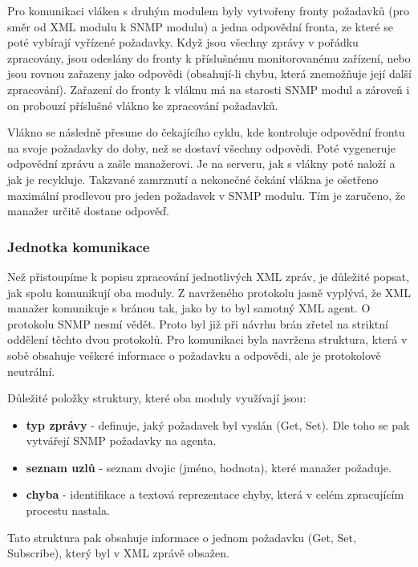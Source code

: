 Pro komunikaci vláken s druhým modulem byly vytvořeny fronty požadavků (pro směr od XML modulu k SNMP modulu)
a jedna odpovědní fronta, ze které se poté vybírají vyřízené požadavky.
Když jsou všechny zprávy v pořádku zpracovány, jsou odeslány do fronty k příslušnému monitorovanému zařízení, nebo jsou rovnou zařazeny
jako odpovědi (obsahují-li chybu, která znemožňuje její další zpracování). Zařazení do fronty k vláknu má na starosti SNMP modul a zároveň
i on probouzí příslušné vlákno ke zpracování požadavků.

Vlákno se následně přesune do čekajícího cyklu, kde kontroluje odpovědní frontu na svoje požadavky do doby, než se dostaví všechny odpovědi. 
Poté vygeneruje odpovědní zprávu a zašle manažerovi. Je na serveru, jak s vlákny poté naloží a jak 
je recykluje. Takzvané zamrznutí a nekonečné čekání vlákna je ošetřeno maximální prodlevou pro jeden požadavek v SNMP modulu. Tím je zaručeno, že
manažer určitě dostane odpověď.

\subsubsection*{Jednotka komunikace}
Než přistoupíme k popisu zpracování jednotlivých XML zpráv, je důležité popsat, jak spolu komunikují oba moduly. Z navrženého protokolu jasně 
vyplývá, že XML manažer komunikuje s bránou tak, jako by to byl samotný XML agent. O protokolu SNMP nesmí vědět. Proto byl již při návrhu
brán zřetel na striktní oddělení těchto dvou protokolů. Pro komunikaci byla navržena struktura, která v sobě obsahuje veškeré informace o
požadavku a odpovědi, ale je protokolově neutrální.

Důležité položky struktury, které oba moduly využívají jsou:
\begin{itemize}
	\item \textbf{typ zprávy} - definuje, jaký požadavek byl vyslán (Get, Set). Dle toho se pak vytvářejí SNMP požadavky na agenta.
	\item \textbf{seznam uzlů} - seznam dvojic (jméno, hodnota), které manažer požaduje.
	\item \textbf{chyba} - identifikace a textová reprezentace chyby, která v celém zpracujícím procestu nastala.
\end{itemize}

Tato struktura pak obsahuje informace o jednom požadavku (Get, Set, Subscribe), který byl v XML zprávě obsažen. 


